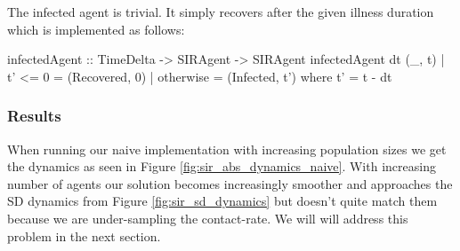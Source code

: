 The infected agent is trivial. It simply recovers after the given illness duration which is implemented as follows:

\begin{HaskellCode}
infectedAgent :: TimeDelta -> SIRAgent -> SIRAgent
infectedAgent dt (_, t) 
    | t' <= 0   = (Recovered, 0)
    | otherwise = (Infected, t')
  where
    t' = t - dt  
\end{HaskellCode}

\subsubsection{Results}
When running our naive implementation with increasing population sizes we get the dynamics as seen in Figure \ref{fig:sir_abs_dynamics_naive}. With increasing number of agents \cite{macal_agent-based_2010} our solution becomes increasingly smoother and approaches the SD dynamics from Figure \ref{fig:sir_sd_dynamics}  but doesn't quite match them because we are under-sampling the contact-rate. We will will address this problem in the next section.

